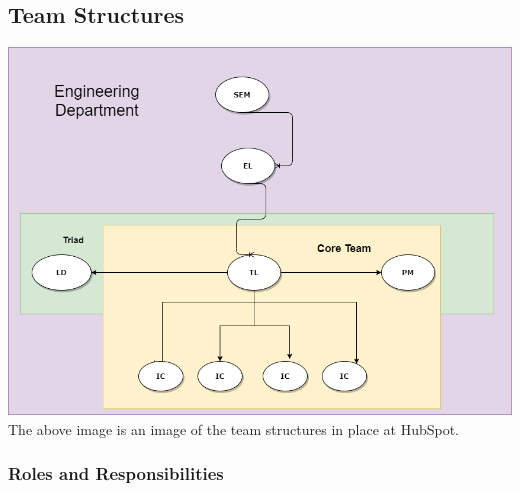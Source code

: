 \documentclass[12pt]{article} %
\begin{document}
\subsection{Team Structures}
\includegraphics[scale = 0.5]{Team Structure.png}
The above image is an image of the team structures in place at HubSpot.
\subsubsection{\textbf{Roles and Responsibilities}}
\end{document}
